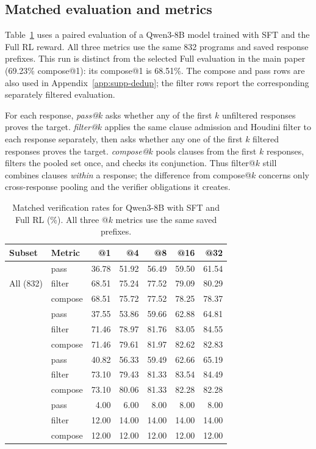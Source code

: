 \documentclass[10pt]{article}
\begin{document}
\subsection{Matched evaluation and metrics}

Table~\ref{tab:supp-filter-compose-pass} uses a paired evaluation of a
Qwen3-8B model trained with SFT and the Full RL reward. All three metrics
use the same 832 programs and saved response prefixes. This run is distinct
from the selected Full evaluation in the main paper (69.23\% compose@1):
its compose@1 is 68.51\%. The compose and pass rows are also used in
Appendix~\ref{app:supp-dedup}; the filter rows report the corresponding
separately filtered evaluation.

For each response, \emph{pass@\(k\)} asks whether any of the first \(k\)
unfiltered responses proves the target. \emph{filter@\(k\)} applies the same
clause admission and Houdini filter to each response separately, then asks
whether any one of the first \(k\) filtered responses proves the target.
\emph{compose@\(k\)} pools clauses from the first \(k\) responses, filters
the pooled set once, and checks its conjunction. Thus filter@\(k\) still
combines clauses \emph{within} a response; the difference from compose@\(k\)
concerns only cross-response pooling and the verifier obligations it creates.

\begin{table}[H]
\centering
\small
\caption{Matched verification rates for Qwen3-8B with SFT and Full RL (\%).
All three @\(k\) metrics use the same saved prefixes.}
\label{tab:supp-filter-compose-pass}
\begin{tabular}{llrrrrr}
\toprule
\rowcolor{headerbg}
Subset & Metric & @1 & @4 & @8 & @16 & @32 \\
\midrule
\multirow{3}{*}{All (832)}
 & pass    & 36.78 & 51.92 & 56.49 & 59.50 & 61.54 \\
 & filter  & 68.51 & 75.24 & 77.52 & 79.09 & 80.29 \\
 & compose & 68.51 & 75.72 & 77.52 & 78.25 & 78.37 \\
\addlinespace
\multirow{3}{*}{Loopy (466)}
 & pass    & 37.55 & 53.86 & 59.66 & 62.88 & 64.81 \\
 & filter  & 71.46 & 78.97 & 81.76 & 83.05 & 84.55 \\
 & compose & 71.46 & 79.61 & 81.97 & 82.62 & 82.83 \\
\addlinespace
\multirow{3}{*}{Linear (316)}
 & pass    & 40.82 & 56.33 & 59.49 & 62.66 & 65.19 \\
 & filter  & 73.10 & 79.43 & 81.33 & 83.54 & 84.49 \\
 & compose & 73.10 & 80.06 & 81.33 & 82.28 & 82.28 \\
\addlinespace
\multirow{3}{*}{NLA (50)}
 & pass    & 4.00 & 6.00 & 8.00 & 8.00 & 8.00 \\
 & filter  & 12.00 & 14.00 & 14.00 & 14.00 & 14.00 \\
 & compose & 12.00 & 12.00 & 12.00 & 12.00 & 12.00 \\
\bottomrule
\end{tabular}
\end{table}
\end{document}

